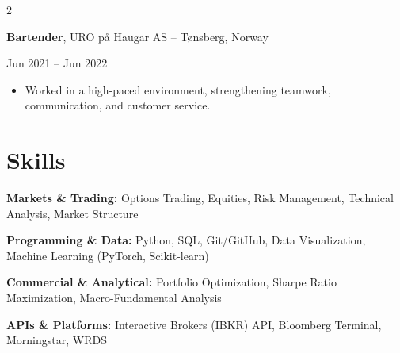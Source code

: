 \documentclass[10pt, letterpaper]{article}
\newenvironment{highlights}{
    \begin{itemize}[
        topsep=0.1 cm, parsep=0.1 cm, partopsep=0pt,
        itemsep=0.05 cm, %
        leftmargin=0 cm
    ]
}{
    \end{itemize}
}
\newenvironment{onecolentry}{\par\addvspace{0.1cm}}{\par\addvspace{0.1cm}}
\newenvironment{twocolentry}[2][]{
    \def\secondColumn{#2}
    \setcolumnwidth{\fill, 4.5 cm}
    \begin{paracol}{2}
}{
    \switchcolumn \raggedleft \secondColumn
    \end{paracol}
}
\begin{document}
\vspace{0.2 cm}

\begin{twocolentry}{Jun 2021 -- Jun 2022}
    \textbf{Bartender}, URO på Haugar AS -- Tønsberg, Norway
\end{twocolentry}
\begin{onecolentry}
    \begin{highlights}
    \setlength\itemindent{2em}
        \item Worked in a high-paced environment, strengthening teamwork, communication, and customer service. 
    \end{highlights}
\end{onecolentry}


\section{Skills}
\begin{onecolentry}
    \textbf{Markets \& Trading:} Options Trading, Equities, Risk Management, Technical Analysis, Market Structure
\end{onecolentry}
\begin{onecolentry}
    \textbf{Programming \& Data:} Python, SQL, Git/GitHub, Data Visualization, Machine Learning (PyTorch, Scikit-learn)
\end{onecolentry}
\begin{onecolentry}
    \textbf{Commercial \& Analytical:} Portfolio Optimization, Sharpe Ratio Maximization, Macro-Fundamental Analysis
\end{onecolentry}
\begin{onecolentry}
    \textbf{APIs \& Platforms:} Interactive Brokers (IBKR) API, Bloomberg Terminal, Morningstar, WRDS
\end{onecolentry}
\end{document}
